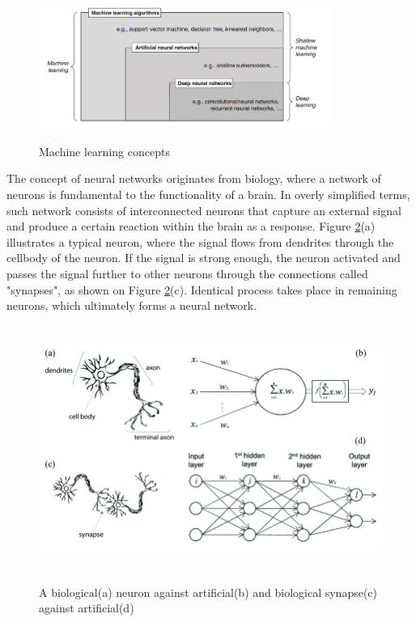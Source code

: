 \documentclass[english, 12pt, a4paper, elec, utf8, a-1b, online]{aaltothesis}
\begin{document}
\begin{figure}[htb]
	\begin{center}
		\includegraphics[height=4cm]{./ml1.png}
	\end{center}
	\caption{Machine learning concepts \cite{Janiesch2021}}
	\begin{center}
		\label{MLConcepts}
	\end{center}
\end{figure}
\FloatBarrier

The concept of neural networks originates from biology, where a network of neurons is fundamental to the functionality of a brain. In overly simplified terms, such network consists of interconnected neurons that capture an external signal and produce a certain reaction within the brain as a response. Figure \ref{NeuronSchem}(a) illustrates a typical neuron, where the signal flows from dendrites through the cellbody of the neuron. If the signal is strong enough, the neuron activated and passes the signal further to other neurons through the connections called "synapses", as shown on Figure \ref{NeuronSchem}(c). Identical process takes place in remaining neurons, which ultimately forms a neural network.\cite{Mehlig_2021}

\begin{figure}[htb]
	\begin{center}
		\includegraphics[height=8cm]{./BioNeuronVsArtificial.png}
	\end{center}
	\caption{A biological(a) neuron against artificial(b) and biological synapse(c) against artificial(d)\cite{article1}}
	\begin{center}
		\label{NeuronSchem}
	\end{center}
\end{figure}
\FloatBarrier
\end{document}
